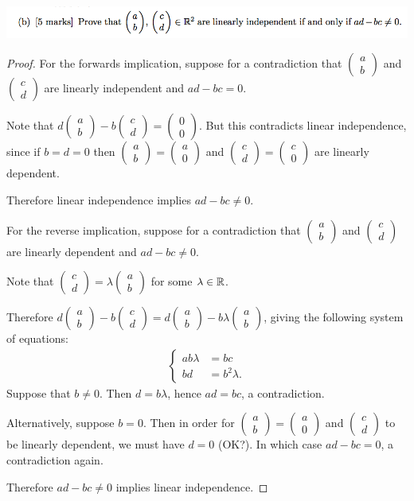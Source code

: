 \documentclass[12pt]{article}
\begin{document}
~\\
\newpage
\begin{mdframed}
\includegraphics[width=400pt]{img/oxford-prelims-2017-A-1-2.png}
\end{mdframed}

\renewcommand{\cvec}[2]{\begin{pmatrix}#1\\#2\end{pmatrix}}

\begin{proof}
  For the forwards implication, suppose for a contradiction that $\cvec{a}{b}$
  and $\cvec{c}{d}$ are linearly independent and $ad - bc = 0$.

  Note that $d\cvec{a}{b} - b\cvec{c}{d} = \cvec{0}{0}$. But this contradicts
  linear independence, since if $b = d = 0$ then $\cvec{a}{b} = \cvec{a}{0}$
  and $\cvec{c}{d} = \cvec{c}{0}$ are linearly dependent.

  Therefore linear independence implies $ad - bc \neq 0$.

  For the reverse implication, suppose for a contradiction that $\cvec{a}{b}$
  and $\cvec{c}{d}$ are linearly dependent and $ad - bc \neq 0$.

  Note that $\cvec{c}{d} = \lambda \cvec{a}{b}$ for some $\lambda \in \mathbb{R}$.


  Therefore $d\cvec{a}{b} - b\cvec{c}{d} = d\cvec{a}{b} - b\lambda\cvec{a}{b}$,
  giving the following system of equations:
  \begin{align*}
    \begin{cases}
      ab\lambda &= bc\\
      bd        &= b^2\lambda.
    \end{cases}
  \end{align*}
  Suppose that $b \neq 0$. Then $d = b\lambda$, hence $ad = bc$, a contradiction.

  Alternatively, suppose $b = 0$. Then in order for $\cvec{a}{b} = \cvec{a}{0}$
  and $\cvec{c}{d}$ to be linearly dependent, we must have $d = 0$ (OK?). In
  which case $ad - bc = 0$, a contradiction again.

  Therefore $ad - bc \neq 0$ implies linear independence.

\end{proof}
\end{document}
